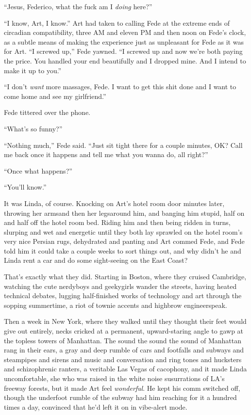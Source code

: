 “Jesus, Federico, what the fuck am I \emph{doing} here?”

“I know, Art, I know.” Art had taken to calling Fede at the extreme
ends of circadian compatibility, three AM and eleven PM and then
noon on Fede’s clock, as a subtle means of making the experience
just as unpleasant for Fede as it was for Art. “I screwed up,” Fede
yawned. “I screwed up and now we’re both paying the price. You
handled your end beautifully and I dropped mine. And I intend to
make it up to you.”

“I don’t \emph{want} more massages, Fede. I want to get this shit
done and I want to come home and see my girlfriend.”

Fede tittered over the phone.

“What’s so funny?”

“Nothing much,” Fede said. “Just sit tight there for a couple
minutes, OK? Call me back once it happens and tell me what you
wanna do, all right?”

“Once what happens?”

“You’ll know.”

It was Linda, of course. Knocking on Art’s hotel room door minutes
later, throwing her arms{\dash}and then her legs{\dash}around him, and banging
him stupid, half on and half off the hotel room bed. Riding him and
then being ridden in turns, slurping and wet and energetic until
they both lay sprawled on the hotel room’s very nice Persian rugs,
dehydrated and panting and Art commed Fede, and Fede told him it
could take a couple weeks to sort things out, and why didn’t he and
Linda rent a car and do some sight-seeing on the East Coast?

That’s exactly what they did. Starting in Boston, where they
cruised Cambridge, watching the cute nerdyboys and geekygirls
wander the streets, having heated technical debates, lugging
half-finished works of technology and art through the sopping
summertime, a riot of townie accents and highbrow engineerspeak.

Then a week in New York, where they walked until they thought their
feet would give out entirely, necks cricked at a permanent,
upward-staring angle to gawp at the topless towers of Manhattan.
The sound the sound the sound of Manhattan rang in their ears, a
gray and deep rumble of cars and footfalls and subways and
steampipes and sirens and music and conversation and ring tones and
hucksters and schizophrenic ranters, a veritable Las Vegas of
cacophony, and it made Linda uncomfortable, she who was raised in
the white noise susurrations of LA’s freeway forests, but it made
Art feel \emph{wonderful}. He kept his comm switched off, though
the underfoot rumble of the subway had him reaching for it a
hundred times a day, convinced that he’d left it on in vibe-alert
mode.

